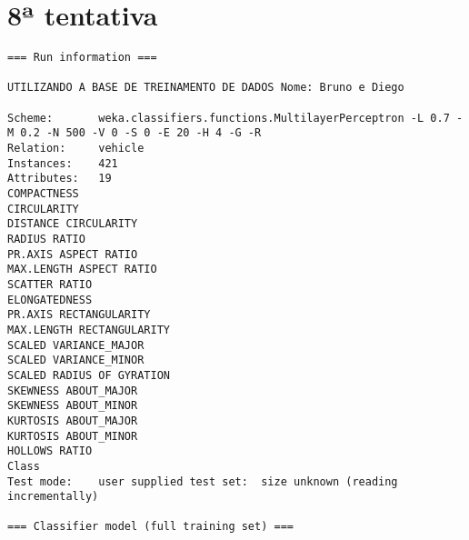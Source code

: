 \documentclass[
	article,			%
	11pt,				%
	oneside,			%
	a4paper,			%
	english,			%
	brazil,				%
	sumario=tradicional
	]{abntex2}
\begin{document}
\section{8ª tentativa}

\begin{lstlisting}
=== Run information ===

UTILIZANDO A BASE DE TREINAMENTO DE DADOS Nome: Bruno e Diego

Scheme:       weka.classifiers.functions.MultilayerPerceptron -L 0.7 -M 0.2 -N 500 -V 0 -S 0 -E 20 -H 4 -G -R
Relation:     vehicle
Instances:    421
Attributes:   19
COMPACTNESS
CIRCULARITY
DISTANCE CIRCULARITY
RADIUS RATIO
PR.AXIS ASPECT RATIO
MAX.LENGTH ASPECT RATIO
SCATTER RATIO
ELONGATEDNESS
PR.AXIS RECTANGULARITY
MAX.LENGTH RECTANGULARITY
SCALED VARIANCE_MAJOR
SCALED VARIANCE_MINOR
SCALED RADIUS OF GYRATION
SKEWNESS ABOUT_MAJOR
SKEWNESS ABOUT_MINOR
KURTOSIS ABOUT_MAJOR
KURTOSIS ABOUT_MINOR
HOLLOWS RATIO
Class
Test mode:    user supplied test set:  size unknown (reading incrementally)

=== Classifier model (full training set) ===


\end{lstlisting}
\end{document}
